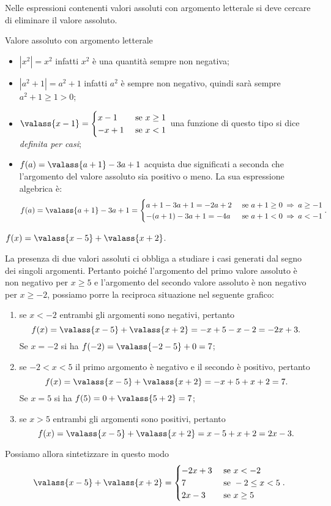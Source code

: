 Nelle espressioni contenenti valori assoluti con argomento letterale si deve cercare di eliminare il
valore assoluto.
\begin{exrig}
 \begin{esempio}
 Valore assoluto con argomento letterale
 \begin{itemize}
 \item $\left|{x^{2}}\right|=x^{2}$ infatti $x^{2}$ è una quantità sempre non negativa;
 \item $\left|{a^{2}+1}\right|=a^{2}+1$ infatti $a^{2}$ è sempre non negativo, quindi sarà sempre $a^2+1 \ge 1 > 0$;
 \item $\valass{x-1}=\begin{cases}
x-1 & \text{ se }x\ge 1\\
-x+1 & \text{ se }x<1
\end{cases}$ una funzione di questo tipo si dice \emph{definita per casi};
 \item $f(a)=\valass{a+1}-3a+1$ acquista due significati a seconda che l'argomento del valore assoluto sia positivo o meno. La sua espressione algebrica è:
\[
f(a)=\valass{a+1}-3a+1=
\begin{cases}
a+1-3a+1=-2a+2 & \text{ se }a+1\ge 0\:\Rightarrow\: a\ge-1\\
-(a+1)-3a+1=-4a & \text{ se }a+1< 0\:\Rightarrow\: a<-1
\end{cases}.
\]
 \end{itemize}
 \end{esempio}
\begin{esempio}
 $f(x)=\valass{x-5}+\valass{x+2}$.

 La presenza di due valori assoluti ci obbliga a studiare i casi generati dal segno dei singoli argomenti.
 Pertanto poiché l'argomento del primo valore assoluto è non negativo per $x\ge 5$ e l'argomento del secondo valore assoluto è non negativo
 per $x\ge -2$, possiamo porre la reciproca situazione nel seguente grafico:
\begin{center}

\end{center}

\begin{enumerate}[label={(\Alph*)}]
 \item se $x<-2$ entrambi gli argomenti sono negativi, pertanto 
\[f(x)=\valass{x-5}+\valass{x+2}=-x+5-x-2=-2x+3.\]
Se $x=-2$ si ha $f(-2)=\valass{-2-5}+0=7$;
 \item se $-2<x<5$ il primo argomento è negativo e il secondo è positivo, pertanto 
\[f(x)=\valass{x-5}+\valass{x+2}=-x+5+x+2=7.\]
Se $x=5$ si ha $f(5)=0+\valass{5+2}=7$;
 \item se $x>5$ entrambi gli argomenti sono positivi, pertanto 
\[f(x)=\valass{x-5}+\valass{x+2}=x-5+x+2=2x-3.\]
\end{enumerate}
Possiamo allora sintetizzare in questo modo
\[
\valass{x-5}+\valass{x+2}=
\begin{cases}
-2x+3 & \text{ se }x<-2\\
7 & \text{ se }-2\le x<5\\
2x-3 & \text{ se }x\ge 5
\end{cases}.
\]
\end{esempio}
\end{exrig}
\ovalbox{\risolvii \ref{ese:1.7}, \ref{ese:1.8}, \ref{ese:1.9}, \ref{ese:1.10}}

\newpage



\cleardoublepage